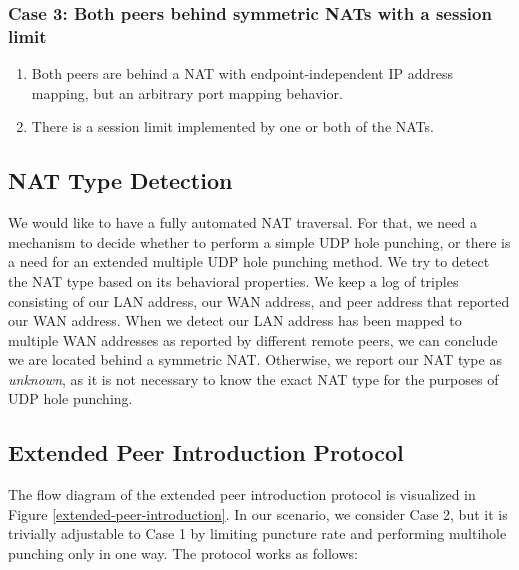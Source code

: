 \subsubsection{Case 3: Both peers behind symmetric NATs with a session limit}
\begin{enumerate}
    \item Both peers are behind a NAT with endpoint-independent IP address mapping, but an arbitrary port mapping behavior.
    \item There is a session limit implemented by one or both of the NATs.
\end{enumerate}



\subsection{NAT Type Detection}

We would like to have a fully automated NAT traversal. For that, we need a mechanism to decide whether to perform a simple UDP hole punching, or there is a need for an extended multiple UDP hole punching method. We try to detect the NAT type based on its behavioral properties. We keep a log of triples consisting of our LAN address, our WAN address, and peer address that reported our WAN address. When we detect our LAN address has been mapped to multiple WAN addresses as reported by different remote peers, we can conclude we are located behind a symmetric NAT. Otherwise, we report our NAT type as \textit{unknown}, as it is not necessary to know the exact NAT type for the purposes of UDP hole punching.

\subsection{Extended Peer Introduction Protocol}

The flow diagram of the extended peer introduction protocol is visualized in Figure \ref{extended-peer-introduction}. In our scenario, we consider Case 2, but it is trivially adjustable to Case 1 by limiting puncture rate and performing multihole punching only in one way. The protocol works as follows:

